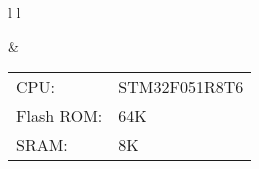 
\begin{tabular}{l l}

\mbox{}

&

\bigskip
\begin{tabular}{l l}
CPU:&STM32F051R8T6\\
Flash ROM:&64K\\
SRAM:&8K\\
\end{tabular}

\\
\end{tabular}



